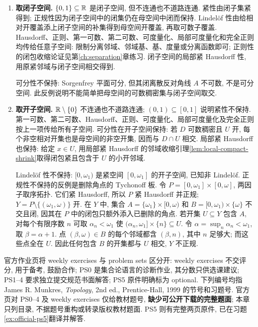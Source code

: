 \begin{solution}
\begin{enumerate}
局部可度量化也不保持: $S_\Omega^{\mathbb N}$ 的每个因子局部可度量化, 但任何非空基本邻域都留下一个完整 $S_\Omega$ 因子. 固定其他坐标, 它含一个同胚于 $S_\Omega$ 的子空间, 因而不能可度量化. 若积中某点有可度量开邻域, 将其缩成基本邻域就得到矛盾.

\item \textbf{取闭子空间.}
$\{0,1\}\subseteq\mathbb R$ 是闭子空间, 但不连通也不道路连通. 紧性由闭子集紧得到; 正规性因为闭子空间中的闭集仍在母空间中闭而保持. Lindel\"of 性由给相对开覆盖添上闭子空间的补集得到母空间开覆盖, 再取可数子覆盖. Hausdorff、正则、第一可数、第二可数、可度量化、局部可度量化和完全正则均传给任意子空间: 限制分离邻域、邻域基、基、度量或分离函数即可; 正则性的闭包收缩论证见第\ref{ch:separation}章练习. 闭子空间的局部紧 Hausdorff 性, 用原紧邻域与闭子空间相交得到.

可分性不保持: Sorgenfrey 平面可分, 但其闭离散反对角线 $A$ 不可数, 不是可分空间. 此反例说明不能简单把母空间的可数稠密集与闭子空间取交.

\item \textbf{取开子空间.}
$\mathbb R\setminus\{0\}$ 不连通也不道路连通; $(0,1)\subseteq[0,1]$ 说明紧性不保持. 第一可数、第二可数、Hausdorff、正则、可度量化、局部可度量化及完全正则按上一项传给所有子空间. 可分性在开子空间保持: 若 $D$ 可数稠密且 $U$ 开, 每个非空相对开集也是母空间的非空开集, 因而与 $D\cap U$ 相交. 局部紧 Hausdorff 也保持: 给定 $x\in U$, 用局部紧 Hausdorff 的邻域收缩引理\ref{lem:local-compact-shrink}取得闭包紧且包含于 $U$ 的小开邻域.

Lindel\"of 性不保持: $[0,\omega_1)$ 是紧空间 $[0,\omega_1]$ 的开子空间, 已知非 Lindel\"of. 正规性不保持的反例是删除角点的 Tychonoff 板. 令 $P=[0,\omega_1]\times[0,\omega]$, 两因子取序拓扑. 它们紧 Hausdorff, 所以 $P$ 紧 Hausdorff 并正规; $Y=P\setminus\{(\omega_1,\omega)\}$ 开. 在 $Y$ 中, 集合 $A=\{\omega_1\}\times[0,\omega)$ 和 $B=[0,\omega_1)\times\{\omega\}$ 不交且闭, 因其在 $P$ 中的闭包只额外添入已删除的角点. 若开集 $U\subseteq Y$ 包含 $A$, 对每个有限序数 $n$ 可取 $\alpha_n<\omega_1$ 使 $(\alpha_n,\omega_1]\times\{n\}\subseteq U$. 令 $\alpha=\sup_n\alpha_n<\omega_1$, 取 $\beta=\alpha+1$. 点 $(\beta,\omega)\in B$ 的每个邻域都含 $(\beta,n)$, 其中 $n$ 足够大; 而这些点全在 $U$. 因此任何包含 $B$ 的开集都与 $U$ 相交, $Y$ 不正规.
\end{enumerate}
\end{solution}

\label{sec:official-topology-directory}
官方作业页将 weekly exercises 与 problem sets 区分开: weekly exercises 不交评分, 用于备考, 鼓励合作; PS0 是集合论语言的诊断作业, 其分数只供选课建议; PS1--4 要求独立提交规范书面解答; PS5 原件明确标为 optional. 下列编号均指 James R. Munkres, \emph{Topology}, 2nd ed., Prentice-Hall, 1999 的节号和习题号. 官方页对 PS0--4 及 weekly exercises 仅给教材题号, \textbf{缺少可公开下载的完整题面}; 本章只列目录, 不据题号重构或转录版权教材题面. PS5 则有完整两页原件, 已在习题\ref{ex:official-ps5}翻译并解答.


